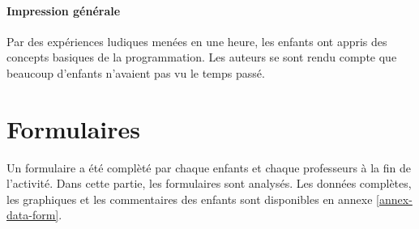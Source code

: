 \paragraph{Impression générale}
Par des expériences ludiques menées en une heure, les enfants ont appris des concepts basiques de la programmation. Les auteurs se sont rendu compte que beaucoup d'enfants n'avaient pas vu le temps passé.


\section{Formulaires}
\label{analyse-exp}
Un formulaire a été complèté par chaque enfants et chaque professeurs à la fin de l'activité. Dans cette partie, les formulaires sont analysés. Les données complètes, les graphiques et les commentaires des enfants sont disponibles en annexe \ref{annex-data-form}. %

